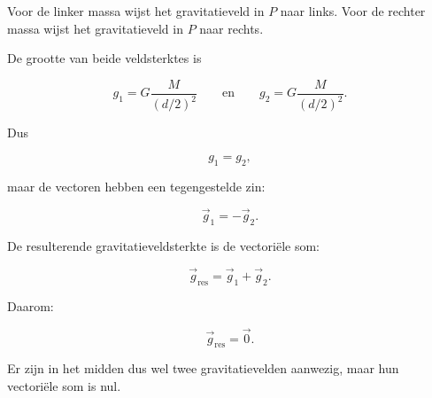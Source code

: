 \documentclass{ximera}
\begin{document}
\begin{voorbeeld}
\begin{center}
\begin{tikzpicture}[>=stealth]
      \end{tikzpicture}
      \end{center}
      
      Voor de linker massa wijst het gravitatieveld in $P$ naar links.
      Voor de rechter massa wijst het gravitatieveld in $P$ naar rechts.
      
      De grootte van beide veldsterktes is
      
      \[
      g_1
      =
      G\frac{M}{(d/2)^2}
      \qquad\text{en}\qquad
      g_2
      =
      G\frac{M}{(d/2)^2}.
      \]
      
      Dus
      
      \[
      g_1=g_2,
      \]
      
      maar de vectoren hebben een tegengestelde zin:
      
      \[
      \vec g_1=-\vec g_2.
      \]
      
      De resulterende gravitatieveldsterkte is de vectoriële som:
      
      \[
      \vec g_{\mathrm{res}}
      =
      \vec g_1+\vec g_2.
      \]
      
      Daarom:
      
      \[
      \boxed{
      \vec g_{\mathrm{res}}=\vec 0.
      }
      \]
      
      Er zijn in het midden dus wel twee gravitatievelden aanwezig, maar
      hun vectoriële som is nul.
      
      \end{voorbeeld}
\end{document}
